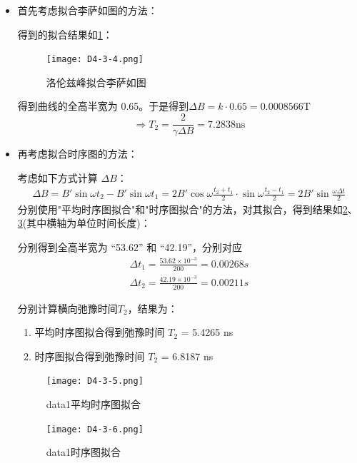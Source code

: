 \documentclass[dvipsnames, svgnames,a4paper,11pt]{article}
\begin{document}
		\begin{itemize}
			\item 首先考虑拟合李萨如图的方法：


				得到的拟合结果如\cref{fig:D4-3-4}：
				\begin{figure}[htbp]
					\centering
					\texttt{[image: D4-3-4.png]}
					\caption{洛伦兹峰拟合李萨如图}
					\label{fig:D4-3-4}
				\end{figure}

				得到曲线的全高半宽为 0.65。于是得到$\Delta B = k \cdot 0.65  = 0.0008566 \mathrm{T}$
				\[
					\Rightarrow T_2 = \frac{2}{\gamma \Delta B} = 7.2838 \mathrm{ns}
				\]


			\item 再考虑拟合时序图的方法：
				
				考虑如下方式计算 $\Delta B$：
				\begin{align*}
					\Delta B = B' \sin \omega t_2 - B' \sin \omega t_1 = 2 B' \cos\omega\frac{t_2 + t_1}{2} \cdot \sin\omega\frac{t_2 - t_1}{2} = 2 B' \sin\frac{\omega \Delta t}{2}
				\end{align*}
				分别使用"平均时序图拟合"和"时序图拟合"的方法，对其拟合，得到结果如\cref{fig:D4-3-5}、\cref{fig:D4-3-6}(其中横轴为单位时间长度)：

				分别得到全高半宽为 “53.62” 和 “42.19”，分别对应
				\begin{align*}
					\Delta t_1 = \frac{53.62 \times 10^{-3}}{200} = 0.00268 s \\
					\Delta t_2 = \frac{42.19 \times 10^{-3}}{200} = 0.00211 s
				\end{align*}

				分别计算横向弛豫时间$T_2$，结果为：
				\begin{enumerate}
					\item 平均时序图拟合得到弛豫时间 $T_2$ = 5.4265 ns
					\item 时序图拟合得到弛豫时间 $T_2$ = 6.8187 ns
				\end{enumerate}

				\begin{figure}[htbp]
					\centering
					\texttt{[image: D4-3-5.png]}
					\caption{data1平均时序图拟合}
					\label{fig:D4-3-5}
				\end{figure}
				\begin{figure}[htbp]
					\centering
					\texttt{[image: D4-3-6.png]}
					\caption{data1时序图拟合}
					\label{fig:D4-3-6}
				\end{figure}

				
		\end{itemize}
\end{document}

